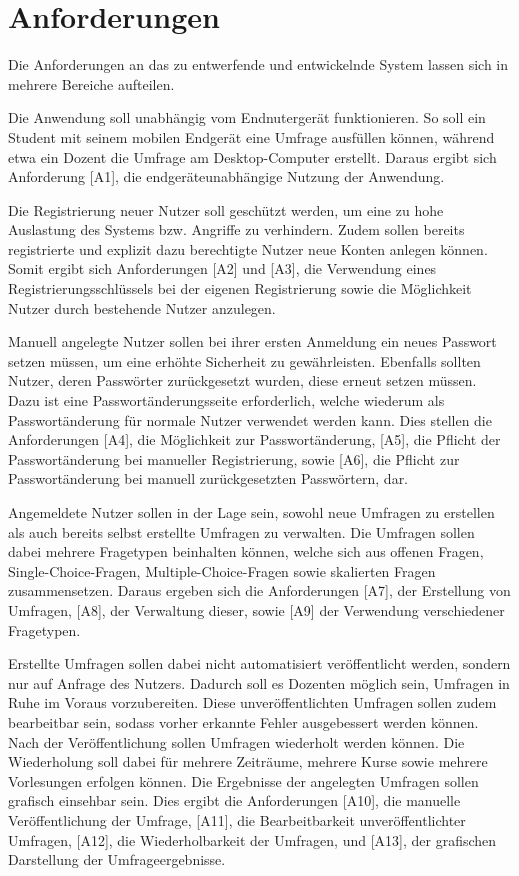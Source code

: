\section{Anforderungen}
\label{sec:Anforderungen}

Die Anforderungen an das zu entwerfende und entwickelnde System lassen sich in mehrere Bereiche aufteilen.

Die Anwendung soll unabhängig vom Endnutergerät funktionieren.
So soll ein Student mit seinem mobilen Endgerät eine Umfrage ausfüllen können, während etwa ein Dozent die Umfrage am Desktop-Computer erstellt.
Daraus ergibt sich Anforderung [A1], die endgeräteunabhängige Nutzung der Anwendung.

Die Registrierung neuer Nutzer soll geschützt werden, um eine zu hohe Auslastung des Systems bzw. Angriffe zu verhindern.
Zudem sollen bereits registrierte und explizit dazu berechtigte Nutzer neue Konten anlegen können.
Somit ergibt sich Anforderungen [A2] und [A3], die Verwendung eines Registrierungsschlüssels bei der eigenen Registrierung sowie die Möglichkeit Nutzer durch bestehende Nutzer anzulegen.

Manuell angelegte Nutzer sollen bei ihrer ersten Anmeldung ein neues Passwort setzen müssen, um eine erhöhte Sicherheit zu gewährleisten.
Ebenfalls sollten Nutzer, deren Passwörter zurückgesetzt wurden, diese erneut setzen müssen.
Dazu ist eine Passwortänderungsseite erforderlich, welche wiederum als Passwortänderung für normale Nutzer verwendet werden kann.
Dies stellen die Anforderungen [A4], die Möglichkeit zur Passwortänderung, [A5], die Pflicht der Passwortänderung bei manueller Registrierung, sowie [A6], die Pflicht zur Passwortänderung bei manuell zurückgesetzten Passwörtern, dar.

Angemeldete Nutzer sollen in der Lage sein, sowohl neue Umfragen zu erstellen als auch bereits selbst erstellte Umfragen zu verwalten.
Die Umfragen sollen dabei mehrere Fragetypen beinhalten können, welche sich aus offenen Fragen, Single-Choice-Fragen, Multiple-Choice-Fragen sowie skalierten Fragen zusammensetzen.
Daraus ergeben sich die Anforderungen [A7], der Erstellung von Umfragen, [A8], der Verwaltung dieser, sowie [A9] der Verwendung verschiedener Fragetypen.

Erstellte Umfragen sollen dabei nicht automatisiert veröffentlicht werden, sondern nur auf Anfrage des Nutzers.
Dadurch soll es Dozenten möglich sein, Umfragen in Ruhe im Voraus vorzubereiten.
Diese unveröffentlichten Umfragen sollen zudem bearbeitbar sein, sodass vorher erkannte Fehler ausgebessert werden können.
Nach der Veröffentlichung sollen Umfragen wiederholt werden können.
Die Wiederholung soll dabei für mehrere Zeiträume, mehrere Kurse sowie mehrere Vorlesungen erfolgen können.
Die Ergebnisse der angelegten Umfragen sollen grafisch einsehbar sein.
Dies ergibt die Anforderungen [A10], die manuelle Veröffentlichung der Umfrage, [A11], die Bearbeitbarkeit unveröffentlichter Umfragen, [A12], die Wiederholbarkeit der Umfragen, und [A13], der grafischen Darstellung der Umfrageergebnisse.

